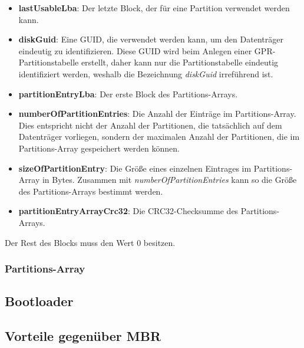 \begin{itemize}
    \item \textbf{lastUsableLba}:
    Der letzte Block, der für eine Partition verwendet werden kann.

    \item \textbf{diskGuid}:
    Eine GUID, die verwendet werden kann, um den Datenträger eindeutig zu identifizieren.\cite{uefi-spec}
    Diese GUID wird beim Anlegen einer GPR-Partitionstabelle erstellt, daher kann nur die Partitionstabelle eindeutig identifiziert werden, weshalb die Bezeichnung \textit{diskGuid} irreführend ist.

    \item \textbf{partitionEntryLba}:
    Der erste Block des Partitions-Arrays.

    \item \textbf{numberOfPartitionEntries}:
    Die Anzahl der Einträge im Partitions-Array.
    Dies entspricht nicht der Anzahl der Partitionen, die tatsächlich auf dem Datenträger vorliegen, sondern der maximalen Anzahl der Partitionen, die im Partitions-Array gespeichert werden können.

    \item \textbf{sizeOfPartitionEntry}:
    Die Größe eines einzelnen Eintrages im Partitions-Array in Bytes.
    Zusammen mit \textit{numberOfPartitionEntries} kann so die Größe des Partitions-Arrays bestimmt werden.

    \item \textbf{partitionEntryArrayCrc32}:
    Die CRC32-Checksumme des Partitions-Arrays.
    
\end{itemize}

Der Rest des Blocks muss den Wert 0 besitzen.

\subsubsection{Partitions-Array}
\label{sec:gpt:structure:entry-array}


\subsection{Bootloader}


\subsection{Vorteile gegenüber MBR}
\label{sec:gpt:advantages}

